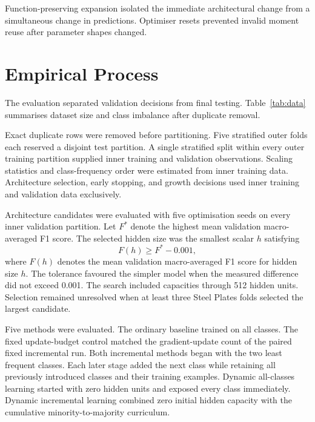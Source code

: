 \documentclass[conference,10pt]{IEEEtran}
\begin{document}
Function-preserving expansion isolated the immediate architectural change from a simultaneous change in predictions. Optimiser resets prevented invalid moment reuse after parameter shapes changed.

\section{Empirical Process}
The evaluation separated validation decisions from final testing. Table~\ref{tab:data} summarises dataset size and class imbalance after duplicate removal.

Exact duplicate rows were removed before partitioning. Five stratified outer folds each reserved a disjoint test partition. A single stratified split within every outer training partition supplied inner training and validation observations. Scaling statistics and class-frequency order were estimated from inner training data. Architecture selection, early stopping, and growth decisions used inner training and validation data exclusively.

\begin{table}[t]
\caption{Data after duplicate removal}
\label{tab:data}\centering
{}
\end{table}

Architecture candidates were evaluated with five optimisation seeds on every inner validation partition. Let $F^{*}$ denote the highest mean validation macro-averaged F1 score. The selected hidden size was the smallest scalar $h$ satisfying
\begin{equation}
 F(h)\geq F^{*}-0.001,
\end{equation}
where $F(h)$ denotes the mean validation macro-averaged F1 score for hidden size $h$. The tolerance favoured the simpler model when the measured difference did not exceed 0.001. The search included capacities through 512 hidden units. Selection remained unresolved when at least three Steel Plates folds selected the largest candidate.

Five methods were evaluated. The ordinary baseline trained on all classes. The fixed update-budget control matched the gradient-update count of the paired fixed incremental run. Both incremental methods began with the two least frequent classes. Each later stage added the next class while retaining all previously introduced classes and their training examples. Dynamic all-classes learning started with zero hidden units and exposed every class immediately. Dynamic incremental learning combined zero initial hidden capacity with the cumulative minority-to-majority curriculum.
\end{document}
